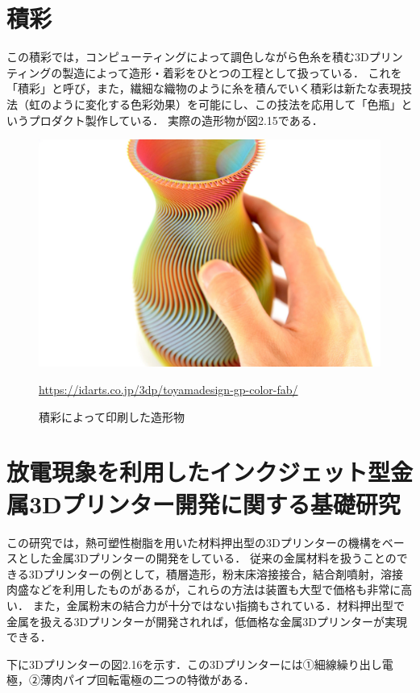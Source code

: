 \section{積彩\cite{aas}}
\label{sec:enum}
この積彩では，コンピューティングによって調色しながら色糸を積む3Dプリンティングの製造によって造形・着彩をひとつの工程として扱っている．
これを「積彩」と呼び，また，繊細な織物のように糸を積んでいく積彩は新たな表現技法（虹のように変化する色彩効果）を可能にし、この技法を応用して「色瓶」というプロダクト製作している．
実際の造形物が図2.15である．

\begin{figure}[H]
  \centering
  \includegraphics[width=12truecm]{./fig/sekisai.jpg}
  \caption{積彩によって印刷した造形物}
  \url{https://idarts.co.jp/3dp/toyamadesign-gp-color-fab/} %
  \label{fig:ferret}
\end{figure}

\section{放電現象を利用したインクジェット型金属3Dプリンター開発に関する基礎研究\cite{j}}
\label{sec:enum}
この研究では，熱可塑性樹脂を用いた材料押出型の3Dプリンターの機構をベースとした金属3Dプリンターの開発をしている．
従来の金属材料を扱うことのできる3Dプリンターの例として，積層造形，粉末床溶接接合，結合剤噴射，溶接肉盛などを利用したものがあるが，これらの方法は装置も大型で価格も非常に高い．
また，金属粉末の結合力が十分ではない指摘もされている．材料押出型で金属を扱える3Dプリンターが開発されれば，低価格な金属3Dプリンターが実現できる．

下に3Dプリンターの図2.16を示す．この3Dプリンターには①細線繰り出し電極，②薄肉パイプ回転電極の二つの特徴がある．

